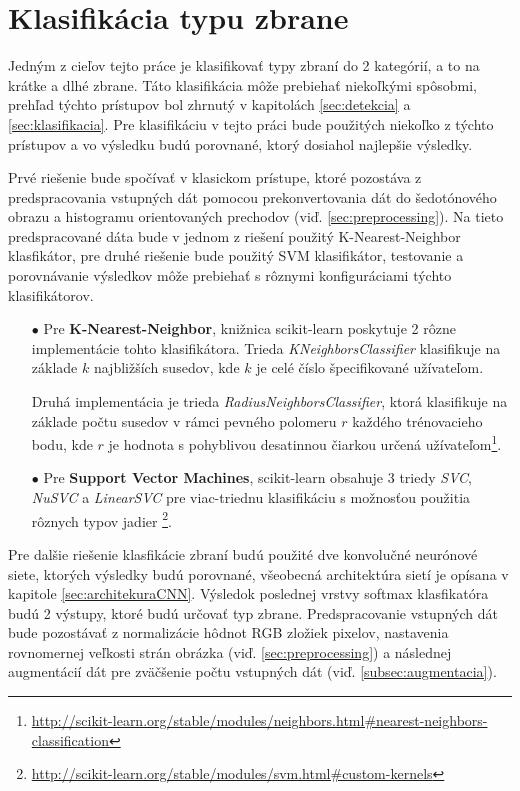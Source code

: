 
\section{Klasifikácia typu zbrane}
\label{sec:klasfikaciatypuzbrane}
Jedným z cieľov tejto práce je klasifikovať typy zbraní do 2 kategórií, a to na krátke a dlhé zbrane.
Táto klasifikácia môže prebiehať niekoľkými spôsobmi, prehľad týchto prístupov bol zhrnutý v kapitolách \ref{sec:detekcia} a \ref{sec:klasifikacia}.
Pre klasifikáciu v tejto práci bude použitých niekoľko z týchto prístupov a vo výsledku budú porovnané, ktorý dosiahol najlepšie výsledky.

Prvé riešenie bude spočívať v klasickom prístupe, ktoré pozostáva z predspracovania vstupných dát pomocou prekonvertovania dát do šedotónového obrazu a histogramu orientovaných prechodov (viď. \ref{sec:preprocessing}).
Na tieto predspracované dáta bude v jednom z riešení použitý K-Nearest-Neighbor klasfikátor, pre druhé riešenie bude použitý SVM klasifikátor, testovanie
    a porovnávanie výsledkov môže prebiehať s rôznymi konfiguráciami týchto klasifikátorov.
\begin{enumerate}
    \item[$\bullet$] Pre \textbf{K-Nearest-Neighbor}, knižnica scikit-learn poskytuje 2 rôzne implementácie tohto klasifikátora.
    Trieda \textit{KNeighborsClassifier} klasifikuje na základe $k$ najbližších susedov, kde $k$ je celé číslo špecifikované užívateľom.
    
    Druhá implementácia je trieda \textit{RadiusNeighborsClassifier}, ktorá klasifikuje na základe počtu susedov v rámci pevného polomeru $r$ každého trénovacieho bodu,
        kde $r$ je hodnota s pohyblivou desatinnou čiarkou určená užívateľom\footnote{\url{http://scikit-learn.org/stable/modules/neighbors.html\#nearest-neighbors-classification}}.
    \item[$\bullet$] Pre \textbf{Support Vector Machines}, scikit-learn obsahuje 3 triedy \textit{SVC}, \textit{NuSVC} a \textit{LinearSVC} pre viac-triednu
        klasifikáciu s možnosťou použitia rôznych typov jadier \footnote{\url{http://scikit-learn.org/stable/modules/svm.html\#custom-kernels}}.
\end{enumerate}

Pre dalšie riešenie klasfikácie zbraní budú použité dve konvolučné neurónové siete, ktorých výsledky budú porovnané, všeobecná architektúra sietí je opísana v kapitole \ref{sec:architekuraCNN}.
Výsledok poslednej vrstvy softmax klasfikatóra budú 2 výstupy, ktoré budú určovať typ zbrane.
Predspracovanie vstupných dát bude pozostávať z normalizácie hôdnot RGB zložiek pixelov, nastavenia rovnomernej veľkosti strán obrázka (viď. \ref{sec:preprocessing})
    a následnej augmentácií dát pre zväčšenie počtu vstupných dát (viď. \ref{subsec:augmentacia}).
